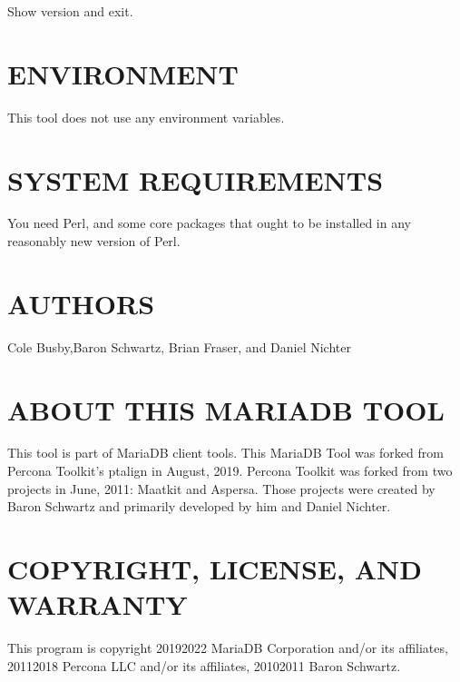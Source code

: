 \documentclass[letterpaper,10pt,english]{sphinxmanual}
\begin{document}
\begin{fulllineitems}
\label{\detokenize{mariadb-align-output:cmdoption-mariadb-align-output-version}}
Show version and exit.

\end{fulllineitems}



\section{ENVIRONMENT}
\label{\detokenize{mariadb-align-output:environment}}
This tool does not use any environment variables.


\section{SYSTEM REQUIREMENTS}
\label{\detokenize{mariadb-align-output:system-requirements}}
You need Perl, and some core packages that ought to be installed in any
reasonably new version of Perl.


\section{AUTHORS}
\label{\detokenize{mariadb-align-output:authors}}
Cole Busby,Baron Schwartz, Brian Fraser, and Daniel Nichter


\section{ABOUT THIS MARIADB TOOL}
\label{\detokenize{mariadb-align-output:about-this-mariadb-tool}}
This tool is part of MariaDB client tools. This MariaDB Tool was forked from
Percona Toolkit’s pt\sphinxhyphen{}align in August, 2019. Percona Toolkit was forked from two
projects in June, 2011: Maatkit and Aspersa.  Those projects were created by
Baron Schwartz and primarily developed by him and Daniel Nichter.


\section{COPYRIGHT, LICENSE, AND WARRANTY}
\label{\detokenize{mariadb-align-output:copyright-license-and-warranty}}
This program is copyright 2019\sphinxhyphen{}2022 MariaDB Corporation and/or its affiliates,
2011\sphinxhyphen{}2018 Percona LLC and/or its affiliates, 2010\sphinxhyphen{}2011 Baron Schwartz.
\end{document}
